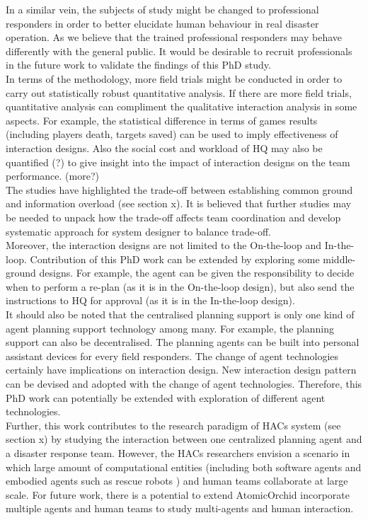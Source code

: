 In a similar vein, the subjects of study might be changed to professional responders in order to better elucidate human behaviour in real disaster operation.  As we believe that the trained professional responders may behave differently with the general public. It would be desirable to recruit professionals in the future work to validate the findings of this PhD study.\\

In terms of the methodology, more field trials might be conducted in order to carry out statistically robust quantitative analysis. If there are more field trials, quantitative analysis can compliment the qualitative interaction analysis in some aspects. For example, the statistical difference in terms of games results (including players death, targets saved) can be used to imply effectiveness of interaction designs. Also the social cost and workload of HQ may also be quantified (?) to give insight into the impact of interaction designs on the team performance. (more?)\\

The studies have highlighted the trade-off between establishing common ground and information overload (see section x). It is believed that further studies may be needed to unpack  how the trade-off affects team coordination and develop systematic approach for system designer to balance trade-off. \\  

Moreover, the interaction designs are not limited to the On-the-loop and In-the-loop. Contribution of this PhD work can be extended by exploring some middle-ground designs. For example, the agent can be given the responsibility to decide when to perform a re-plan (as it is in the On-the-loop design), but also send the instructions to HQ for approval (as it is in the In-the-loop design).\\

It should also be noted that the centralised planning support is only one kind of agent planning support technology among many. For example, the planning support can also be decentralised. The planning agents can be built into personal assistant devices for every field responders. The change of agent technologies certainly have implications on interaction design. New interaction design pattern can be devised and adopted with the change of agent technologies. Therefore, this PhD work can potentially be extended with exploration of different agent technologies.\\ 

Further, this work contributes to the research paradigm of HACs system (see section x) by studying the interaction between one centralized planning agent and a disaster response team. However, the HACs researchers envision a scenario in which large amount of computational entities (including both software agents and embodied agents such as rescue robots ) and human teams collaborate at large scale. For future work, there is a potential to extend AtomicOrchid incorporate multiple agents and human teams to study multi-agents and human interaction.\\




